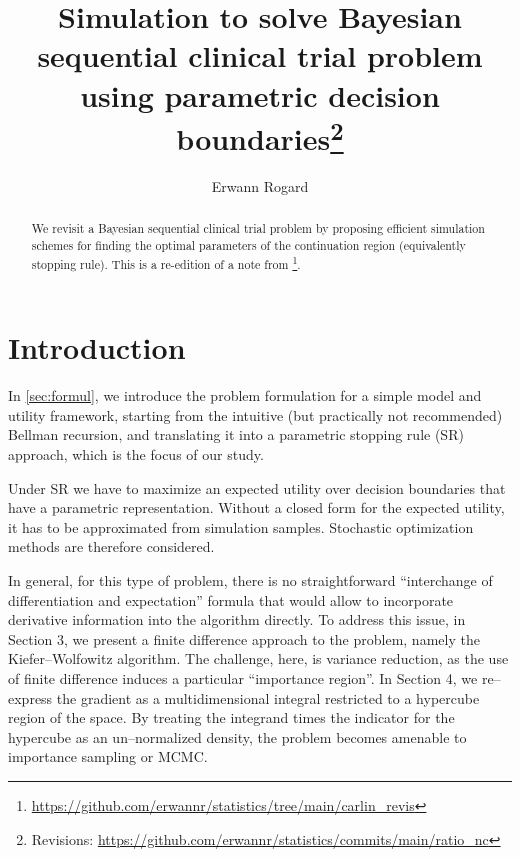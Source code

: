 \documentclass{article}
\begin{document}
\title{Simulation to solve Bayesian sequential clinical trial problem using parametric decision boundaries\footnote{Revisions: \url{https://github.com/erwannr/statistics/commits/main/ratio_nc}}}

\author{Erwann Rogard}
\date{\ThisDate}

\maketitle

\begin{abstract}
We revisit a Bayesian sequential clinical trial problem\cite{carlin1998} by proposing efficient simulation schemes for finding the
optimal parameters of the continuation region (equivalently stopping
rule). This is a re-edition of a note from \footnote{\url{https://github.com/erwannr/statistics/tree/main/carlin_revis}}.
\end{abstract}

\section{Introduction}
In \autoref{sec:formul}, we introduce the problem formulation for a simple
model and utility framework, starting from the intuitive (but
practically not recommended) Bellman recursion, and translating it
into a parametric stopping rule (SR) approach, which is the focus of
our study.

Under SR we have to maximize an expected utility over decision
boundaries  that have a parametric representation. Without a closed
form for the expected utility, it has to be approximated from
simulation samples. Stochastic optimization methods are therefore
considered.

In general, for this type of problem, there is no straightforward
``interchange of differentiation and expectation'' formula that
would allow to incorporate derivative information into the algorithm
directly. To address this issue, in Section 3, we present a finite
difference approach to the problem, namely the Kiefer--Wolfowitz
algorithm. The challenge, here, is variance reduction, as the use of
finite difference induces a particular ``importance region''. In
Section 4, we re--express the gradient as a multidimensional
integral restricted to a hypercube region of the space. By treating
the integrand times the indicator for the hypercube as an
un--normalized density, the problem becomes amenable to importance
sampling or MCMC.
\end{document}
